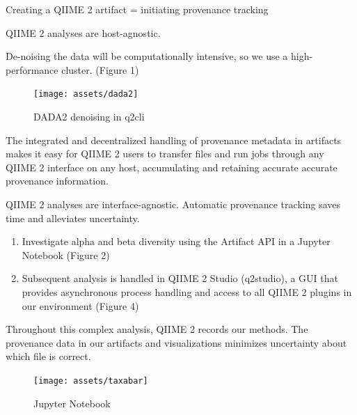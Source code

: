 \documentclass[final]{beamer}
\newlength{\colwidth}
\begin{document}
\begin{frame}[t]
\begin{columns}[t]
\begin{column}{\colwidth}
\begin{block}{Creating a QIIME 2 artifact = initiating provenance tracking}
  \end{block}

  \begin{block}{QIIME 2 analyses are host-agnostic.}

    De-noising the data will be computationally intensive, so we use a
    high-performance cluster. (Figure 1)
    \begin{figure}[tph!]
      {\texttt{[image: assets/dada2]}}
      \caption{DADA2 denoising in q2cli}
    \end{figure}

    \begin{tcolorbox}
    [width=\textwidth, colframe=blue]
    {The integrated and decentralized handling of provenance metadata in
    artifacts makes it easy for QIIME 2 users to transfer files and run jobs
    through any QIIME 2 interface on any host, accumulating and retaining
    accurate accurate provenance information}.
  \end{tcolorbox}

  \end{block}

  \begin{block}{QIIME 2 analyses are interface-agnostic. Automatic provenance tracking saves time and alleviates uncertainty.}

    \begin{enumerate}
      \item Investigate alpha and beta diversity using the Artifact API in
      a Jupyter Notebook\cite{PER-GRA:2007} (Figure 2)
      \item Subsequent analysis is handled in QIIME 2 Studio (q2studio), a GUI
      that provides asynchronous process handling and access to all
      QIIME 2 plugins in our environment (Figure 4)
    \end{enumerate}

    \begin{tcolorbox}
    [width=\textwidth, colframe=blue]
    {Throughout this complex analysis, QIIME 2 records our methods.
    The provenance data in our artifacts and visualizations minimizes
    uncertainty about which file is correct}.
    \end{tcolorbox}

    \begin{figure}[tph!]
      {\texttt{[image: assets/taxabar]}}
      \caption{Jupyter Notebook}
    \end{figure}

  \end{block}


\end{column}
\end{columns}
\end{frame}
\end{document}
